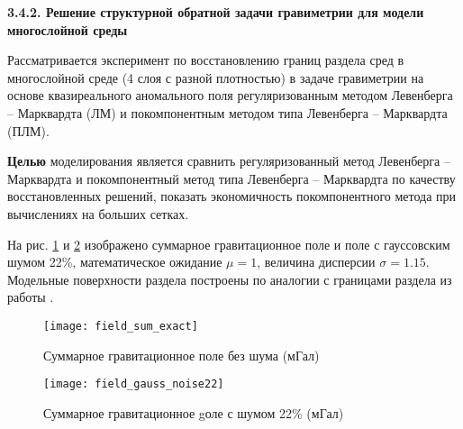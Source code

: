 %
%
% 

\newpage
{\bfseries 3.4.2. Решение структурной обратной задачи гравиметрии для модели многослойной среды} 

Рассматривается эксперимент по восстановлению границ раздела сред в многослойной среде (4 слоя с разной плотностью) в задаче гравиметрии на основе квазиреального аномального поля регуляризованным методом Левенберга -- Марквардта (ЛМ) и покомпонентным методом типа Левенберга -- Марквардта (ПЛМ).

{\bfseries Целью} моделирования является сравнить регуляризованный метод Левенберга -- Марквардта и покомпонентный метод типа Левенберга -- Марквардта по качеству восстановленных решений, показать экономичность покомпонентного метода при вычислениях на больших сетках.

На рис. \ref{fig:field_sum_exact} и \ref{fig:field_gauss_noise22} изображено суммарное гравитационное поле и поле с гауссовским шумом 22\%, математическое ожидание $\mu=1$, величина дисперсии $\sigma=1.15$. Модельные поверхности раздела построены по аналогии с границами раздела из работы \cite{MarAkiMis2016}.
\begin{figure}[H]
	\centering
	\texttt{[image: field\_sum\_exact]}
	\caption{Суммарное гравитационное поле без шума (мГал)}
	\label{fig:field_sum_exact}
\end{figure}
\begin{figure}[H]
	\centering
	\texttt{[image: field\_gauss\_noise22]}
	\caption{Суммарное гравитационное gоле с шумом 22\% (мГал)}
	\label{fig:field_gauss_noise22}
\end{figure}

